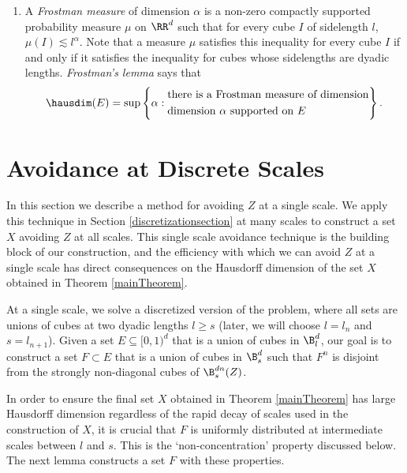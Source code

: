 \begin{enumerate}
	\item\label{frostmanItem} A {\it Frostman measure} of dimension $\alpha$ is a non-zero compactly supported probability measure $\mu$ on $\RR^d$ such that for every cube $I$ of sidelength $l$, $\mu(I) \lesssim l^\alpha$. Note that a measure $\mu$ satisfies this inequality for every cube $I$ if and only if it satisfies the inequality for cubes whose sidelengths are dyadic lengths. {\it Frostman's lemma} says that
	\begin{equation}  \hausdim(E) = \sup \left\{ \alpha: 
	\begin{aligned}
	&\text{there is a Frostman measure of dimension}\\
	&\text{dimension $\alpha$ supported on $E$} 
	\end{aligned} 
	\right\}.  \label{Hdim-defn} \end{equation} 
\end{enumerate}









\section{Avoidance at Discrete Scales}\label{discretesection}

In this section we describe a method for avoiding $Z$ at a single scale. We apply this technique in Section \ref{discretizationsection} at many scales to construct a set $X$ avoiding $Z$ at all scales. This single scale avoidance technique is the building block of our construction, and the efficiency with which we can avoid $Z$ at a single scale has direct consequences on the Hausdorff dimension of the set $X$ obtained in Theorem \ref{mainTheorem}.

At a single scale, we solve a discretized version of the problem, where all sets are unions of cubes at two dyadic lengths $l \geq s$ (later, we will choose $l=l_n$ and $s=l_{n+1}$). Given a set $E \subseteq [0,1)^d$ that is a union of cubes in $\B_l^d$, our goal is to construct a set $F\subset E$ that is a union of cubes in $\B_s^d$ such that $F^n$ is disjoint from the strongly non-diagonal cubes of $\B_{s}^{dn}(Z)$.

In order to ensure the final set $X$ obtained in Theorem \ref{mainTheorem} has large Hausdorff dimension regardless of the rapid decay of scales used in the construction of $X$, it is crucial that $F$ is uniformly distributed at intermediate scales between $l$ and $s$. This is the `non-concentration' property discussed below. The next lemma constructs a set $F$ with these properties. 

